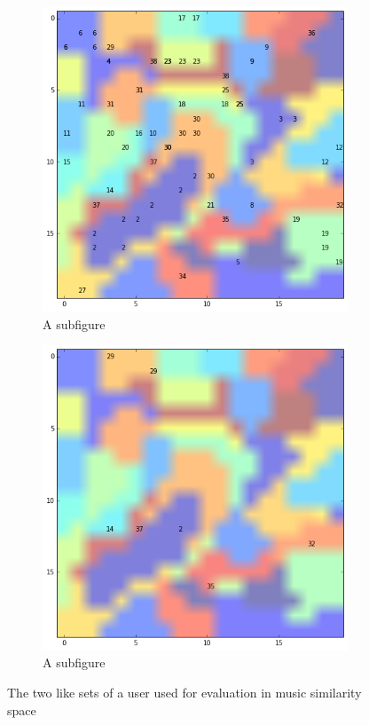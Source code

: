 \documentclass[cic,tc,english]{iiufrgs}
\begin{document}
\begin{figure}
\centering
\begin{subfigure}{.5\textwidth}
  \centering
  \includegraphics[width=\linewidth]{recs}
  \caption{A subfigure}
  \label{fig:known likes}
\end{subfigure}%
\begin{subfigure}{.5\textwidth}
  \centering
  \includegraphics[width=\linewidth]{eval}
  \caption{A subfigure}
  \label{fig:hidden likes}
\end{subfigure}
\caption{The two like sets of a user used for evaluation in music similarity space}
\label{fig:test}
\end{figure}
\end{document}
